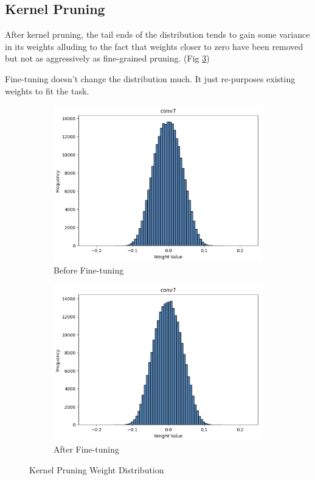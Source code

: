 \documentclass[12pt]{article}
\begin{document}
\subsection{Kernel Pruning}
After kernel pruning, the tail ends of the distribution tends to gain some variance in its weights alluding to the fact that weights closer to zero have been removed but not as aggressively as fine-grained pruning. (Fig \ref{fig:kernel_w_dis})

Fine-tuning doesn't change the distribution much. It just re-purposes existing weights to fit the task. 


\begin{figure}[h]
\centering
\begin{subfigure}{.5\textwidth}
  \centering
  \includegraphics[width=1\linewidth]{report_images/kernel_w_dist_pp.png}
  \caption{Before Fine-tuning}
  \label{fig:kernel_dis_tt}
\end{subfigure}%
\begin{subfigure}{.5\textwidth}
  \centering
  \includegraphics[width=1\linewidth]{report_images/kernel_w_dist_ft.png}
  \caption{After Fine-tuning}
  \label{fig:kernel_dis_ft}
\end{subfigure}
\caption{Kernel Pruning Weight Distribution}
\label{fig:kernel_w_dis}
\end{figure}
\end{document}
